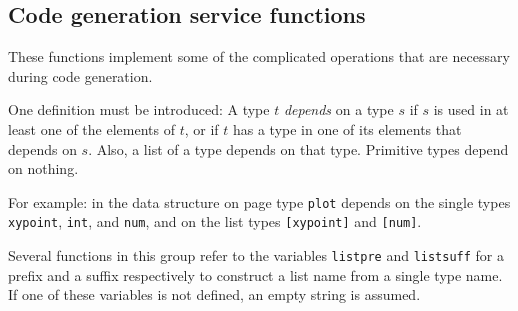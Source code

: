 \subsection{Code generation service functions}
These functions implement some of the complicated operations that
are necessary during code generation. 
\par
One definition must be introduced:
A type $t$ {\em depends} on a type $s$ if $s$
is used in at least one of the elements of $t$,
or if $t$ has a type in one of its elements that depends on $s$.
Also,
a list of a type depends on that type.
Primitive types depend on nothing.
\par
For example:
in the data structure on page \pageref{plotds} type {\tt plot}
depends on the single types {\tt xypoint}, {\tt int}, and {\tt num},
and on the list types {\tt [xypoint]} and {\tt [num]}.
\par
Several functions in this group refer to the {\Tm} variables \verb+listpre+
and \verb+listsuff+ for a prefix and a suffix respectively to construct
a list name from a single type name.
If one of these variables is not defined, an empty string is assumed.
\par
